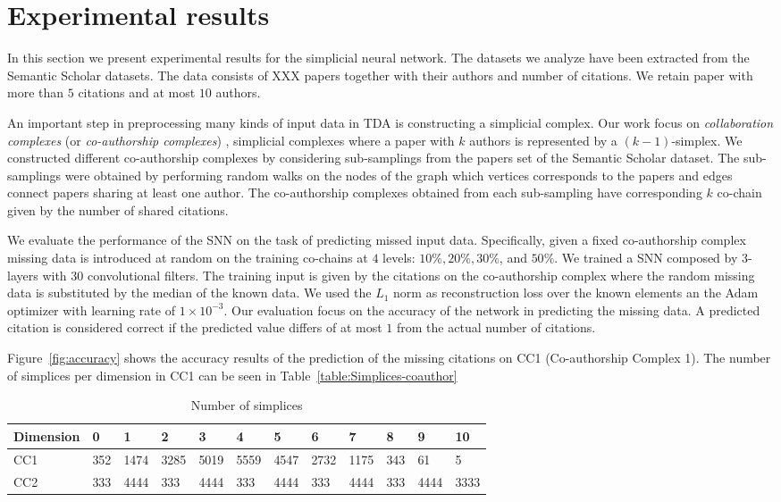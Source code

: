 \section{Experimental results}
In this section we present experimental results for the simplicial neural network. The datasets we analyze have been extracted from the Semantic Scholar datasets. The data consists of XXX papers together with their authors and number of citations. We retain paper with more than $5$ citations and at most $10$ authors.

An important step in preprocessing many kinds of input data in TDA is constructing a simplicial complex. Our work focus on \emph{collaboration complexes} (or \emph{co-authorship complexes}) , simplicial complexes where a paper with $k$ authors is represented by a $(k-1)$-simplex. We constructed different co-authorship complexes by considering sub-samplings from the papers set of the Semantic Scholar dataset. The sub-samplings were obtained by performing random walks on the nodes of the graph which vertices corresponds to the papers and edges connect papers sharing at least one author. The co-authorship complexes obtained from each sub-sampling  have corresponding $k$ co-chain given by the number of shared citations.

We evaluate the performance of the SNN on the task of predicting missed input data. 
Specifically, given a fixed co-authorship complex missing data is introduced 
at random on the training co-chains at $4$ levels: $10\%,  20\%,  30\%$, and $50\% $.  We trained a SNN composed by $3$-layers with $30$ convolutional filters.  The training input is given by the citations on the co-authorship complex where the random missing data is substituted by the median of the known data. We used the $L_1$ norm as reconstruction loss over the known elements an the Adam optimizer with learning rate of $1\times 10^{-3}$.  Our evaluation  focus on the accuracy of the network in predicting the missing data. A predicted citation is considered correct if the predicted value differs of at most $1$ from the actual number of citations.

Figure~\ref{fig:accuracy} shows the accuracy results of the prediction of the missing citations on CC1 (Co-authorship Complex 1). The number of simplices per dimension in CC1 can be seen in Table~\ref{table:Simplices-coauthor}
\begin{table}
  \caption{%
  Number of simplices
  }
  \label{Simplices-coauthor}
  \centering
  \begin{tabular}{llllllllllll}
    \cmidrule(r){1-12}
    Dimension   & 0     & 1  & 2     & 3 & 4     & 5 & 6    & 7 & 8   & 9 & 10\\
    \midrule
    CC1 & 352  & 1474  & 3285  & 5019  & 5559  & 4547  & 2732  & 1175  & 343 & 61 & 5\\
    CC2 & 333 & 4444 & 333 & 4444 & 333 & 4444  & 333 & 4444  & 333 & 4444 &3333\\ 
    \bottomrule
  \end{tabular}
\end{table}
 
